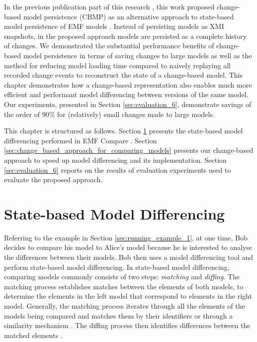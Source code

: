 In the previous publication part of this research \cite{DBLP:conf/models/YohannisKP17,yohannis2018towards,DBLP:conf/models/YohannisRPK18}, this work proposed change-based model persistence (CBMP) as an alternative approach to state-based model persistence of EMF models \cite{steinberg2008emf}. Instead of persisting models as XMI snapshots, in the proposed approach models are persisted as a complete history of changes. We demonstrated the substantial performance benefits of change-based model persistence in terms of saving changes to large models \cite{DBLP:conf/models/YohannisKP17} as well as the method for reducing model loading time compared to naively replaying all recorded change events \cite{DBLP:conf/models/YohannisRPK18} to reconstruct the state of a change-based model. 
This chapter demonstrates how a change-based representation also enables much more efficient and performant model differencing between versions of the same model. Our experiments, presented in Section \ref{sec:evaluation_6}, demonstrate savings of the order of 90\% for (relatively) small changes made to large models.

This chapter is structured as follows. Section \ref{sec:state-based_model_differencing} presents the state-based model differencing performed in EMF Compare \cite{emfcompare2018developer}. 
Section \ref{sec:change_based_approach_for_comparing_models} presents our change-based approach to speed up model differencing and its implementation. 
Section \ref{sec:evaluation_6} reports on the results of evaluation experiments used to evaluate the proposed approach.

\section{State-based Model Differencing}
\label{sec:state-based_model_differencing}
Referring to the example in Section \ref{sec:running_example_1}, at one time, Bob decides to compare his model to Alice's model because he is interested to analyse the differences between their models. Bob then uses a model differencing tool and perform state-based model differencing. 
In state-based model differencing, comparing models commonly consists of two steps: \emph{matching} and \emph{diffing}.
The matching process establishes matches between the elements of both models, to determine the elements in the left model that correspond to elements in the right model. Generally, the matching process iterates through all the elements of the models being compared and matches them by their identifiers or through a similarity mechanism  \cite{DBLP:conf/sfm/BroschKLSWW12,emfcompare2018developer}. The diffing process then identifies differences between the matched elements \cite{DBLP:conf/sfm/BroschKLSWW12,emfcompare2018developer}. 

